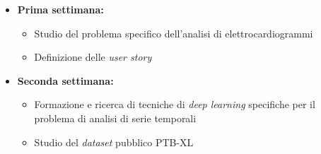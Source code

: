 \begin{itemize}
    \item \textbf{Prima settimana:}
        \begin{itemize}
            \item Studio del problema specifico dell'analisi di elettrocardiogrammi
            \item Definizione delle \textit{user story}
        \end{itemize}
    \item \textbf{Seconda settimana:}
        \begin{itemize}
            \item Formazione e ricerca di tecniche di \textit{deep learning} specifiche per il problema di analisi di serie temporali
            \item Studio del \textit{dataset} pubblico PTB-XL
        \end{itemize}

    \newpage


\end{itemize}
